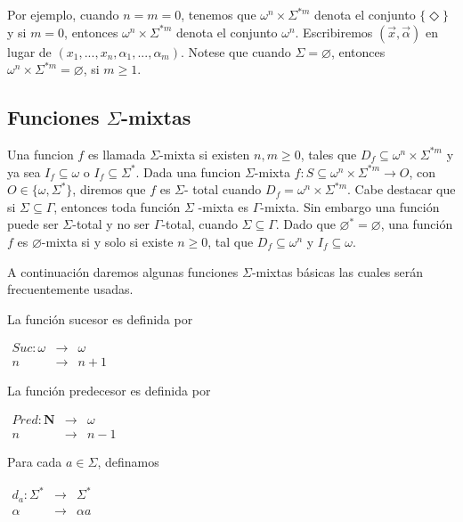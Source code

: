 Por ejemplo, cuando \(n=m=0\), tenemos que \(\omega ^{n}\times \Sigma ^{\ast m}\) denota el conjunto \(\{\Diamond \}\) y si \(m=0\), entonces \(\omega ^{n}\times \Sigma ^{\ast m}\) denota el conjunto \(\omega ^{n}\). Escribiremos \((\vec{x}, \vec{\alpha})\) en lugar de \((x_{1},...,x_{n},\alpha _{1},...,\alpha _{m})\). Notese que cuando \(\Sigma =\varnothing \), entonces \(\omega ^{n}\times \Sigma ^{\ast m}=\varnothing \), si \(m\geq 1\).

\subsection{Funciones \(\Sigma \)-mixtas}

Una funcion \(f\) es llamada \(\Sigma \)-mixta si existen \(n,m\geq 0\), tales que \(D_{f}\subseteq \omega ^{n}\times \Sigma ^{\ast m}\) y ya sea \( I_{f}\subseteq \omega \) o \(I_{f}\subseteq \Sigma ^{\ast }\). Dada una funcion \(\Sigma \)-mixta \(f:S\subseteq \omega ^{n}\times \Sigma ^{\ast m}\rightarrow O \), con \(O\in \{\omega ,\Sigma ^{\ast }\}\), diremos que \(f\) es \(\Sigma \)- total cuando \(D_{f}=\omega ^{n}\times \Sigma ^{\ast m}\). Cabe destacar que si \(\Sigma \subseteq \Gamma \), entonces toda función \(\Sigma \) -mixta es \(\Gamma \)-mixta. Sin embargo una función puede ser \(\Sigma \)-total y no ser \(\Gamma \)-total, cuando \(\Sigma \subseteq \Gamma \). Dado que \( \varnothing ^{\ast }=\varnothing \), una función \(f\) es \(\varnothing \)-mixta si y solo si existe \(n\geq 0\), tal que \(D_{f}\subseteq \omega ^{n}\) y \( I_{f}\subseteq \omega \).

A continuación daremos algunas funciones \(\Sigma \)-mixtas básicas las cuales serán frecuentemente usadas.

La función sucesor es definida por

\(\displaystyle \begin{array}{rll} Suc:\omega & \rightarrow & \omega \\ n & \rightarrow & n+1 \end{array} \)

La función predecesor es definida por

\(\scriptstyle \begin{array}{rll} Pred:\mathbf{N} & \rightarrow & \omega \\ n & \rightarrow & n-1 \end{array} \)

Para cada \(a\in \Sigma \), definamos

\(\displaystyle \begin{array}{rll} d_{a}:\Sigma ^{\ast } & \rightarrow & \Sigma ^{\ast } \\ \alpha & \rightarrow & \alpha a \end{array} \)

